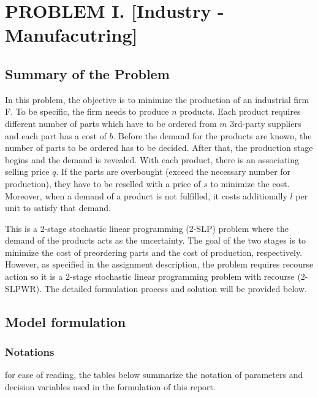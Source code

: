 \newpage
\section{PROBLEM I. [Industry - Manufacutring]}
	\subsection{Summary of the Problem}

	\qquad In this problem, the objective is to minimize the production of an industrial firm F. To be specific, the firm needs to produce $n$ products. Each product requires different number of parts which have to be ordered from $m$ 3rd-party suppliers and each part has a cost of $b$. Before the demand for the products are known, the number of parts to be ordered has to be decided. After that, the production stage begins and the demand is revealed. With each product, there is an associating selling price $q$. If the parts are overbought (exceed the necessary number for production), they have to be reselled with a price of $s$ to minimize the cost. Moreover, when a demand of a product is not fulfilled, it costs additionally $l$ per unit to satisfy that demand.

	\qquad This is a 2-stage stochastic linear programming (2-SLP) problem where the demand of the products acts as the uncertainty. The goal of the two stages is to minimize the cost of preordering parts and the cost of production, respectively. However, as specified in the assignment description, the problem requires recourse action so it is a 2-stage stochastic linear programming problem with recourse (2-SLPWR). The detailed formulation process and solution will be provided below.
	
	\subsection{Model formulation}
		\subsubsection{Notations}
		
		\qquad for ease of reading, the tables below summarize the notation of parameters and decision variables used in 
the formulation of this report.

